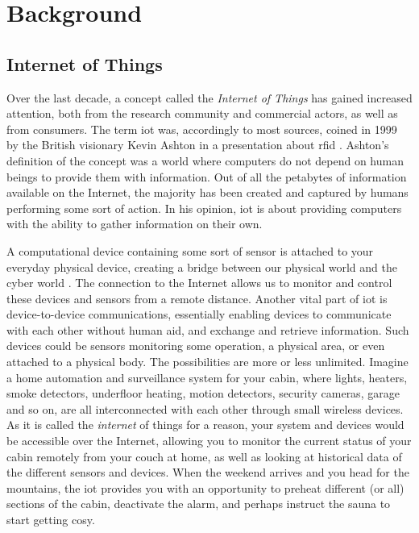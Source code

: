 \chapter{Background}
\label{chp:background}

\section{Internet of Things}

Over the last decade, a concept called the \emph{Internet of Things} has gained increased attention, both from the research community and commercial actors, as well as from consumers. The term \gls{iot} was, accordingly to most sources, coined in 1999 by the British visionary Kevin Ashton in a presentation about \gls{rfid} \cite{iot-phrase-2} \cite{iot-phrase-1}. Ashton's definition of the concept was a world where computers do not depend on human beings to provide them with information. Out of all the petabytes of information available on the Internet, the majority has been created and captured by humans performing some sort of action. In his opinion, \gls{iot} is about providing computers with the ability to gather information on their own.






A computational device containing some sort of sensor is attached to your everyday physical device, creating a bridge between our physical world and the cyber world \cite{Kopetz2011}. The connection to the Internet allows us to monitor and control these devices and sensors from a remote distance. Another vital part of \gls{iot} is device-to-device communications, essentially enabling devices to communicate with each other without human aid, and exchange and retrieve information. Such devices could be sensors monitoring some operation, a physical area, or even attached to a physical body. The possibilities are more or less unlimited. Imagine a home automation and surveillance system for your cabin, where lights, heaters, smoke detectors, underfloor heating, motion detectors, security cameras, garage and so on, are all interconnected with each other through small wireless devices. As it is called the \emph{internet} of things for a reason, your system and devices would be accessible over the Internet, allowing you to monitor the current status of your cabin remotely from your couch at home, as well as looking at historical data of the different sensors and devices. When the weekend arrives and you head for the mountains, the \gls{iot} provides you with an opportunity to preheat different (or all) sections of the cabin, deactivate the alarm, and perhaps instruct the sauna to start getting cosy. 

